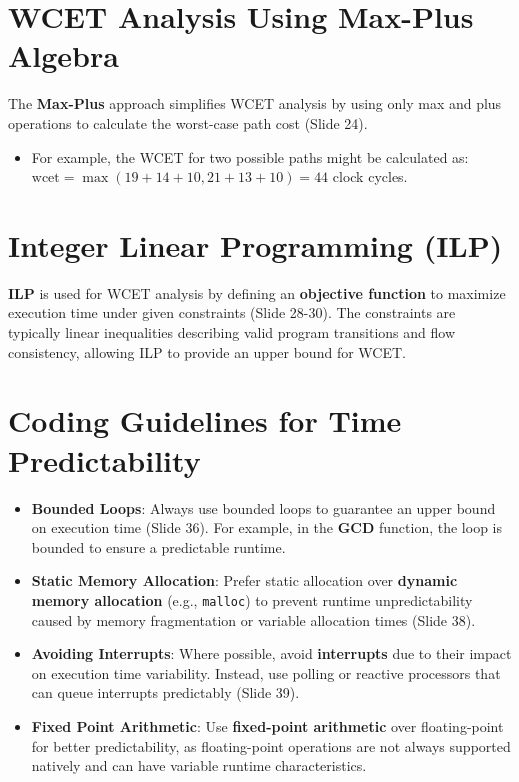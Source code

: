 \documentclass[
  14pt,
  a4paper,
  numbers=noendperiod,
  headinclude=true,
  footinclude=true,
  DIV=calc]{scrreprt}
\providecommand{\tightlist}{%
  \setlength{\itemsep}{0pt}\setlength{\parskip}{0pt}}\usepackage{longtable,booktabs,array}
\begin{document}
\section{WCET Analysis Using Max-Plus
Algebra}\label{wcet-analysis-using-max-plus-algebra}

The \textbf{Max-Plus} approach simplifies WCET analysis by using only
max and plus operations to calculate the worst-case path cost (Slide
24).

\begin{itemize}
\tightlist
\item
  For example, the WCET for two possible paths might be calculated as:
  \(\text{wcet} = \max(19 + 14 + 10, 21 + 13 + 10) = 44\) clock cycles.
\end{itemize}

\section{Integer Linear Programming
(ILP)}\label{integer-linear-programming-ilp}

\textbf{ILP} is used for WCET analysis by defining an \textbf{objective
function} to maximize execution time under given constraints (Slide
28-30). The constraints are typically linear inequalities describing
valid program transitions and flow consistency, allowing ILP to provide
an upper bound for WCET.

\section{Coding Guidelines for Time
Predictability}\label{coding-guidelines-for-time-predictability}

\begin{itemize}
\item
  \textbf{Bounded Loops}: Always use bounded loops to guarantee an upper
  bound on execution time (Slide 36). For example, in the \textbf{GCD}
  function, the loop is bounded to ensure a predictable runtime.
\item
  \textbf{Static Memory Allocation}: Prefer static allocation over
  \textbf{dynamic memory allocation} (e.g., \texttt{malloc}) to prevent
  runtime unpredictability caused by memory fragmentation or variable
  allocation times (Slide 38).
\item
  \textbf{Avoiding Interrupts}: Where possible, avoid
  \textbf{interrupts} due to their impact on execution time variability.
  Instead, use polling or reactive processors that can queue interrupts
  predictably (Slide 39).
\item
  \textbf{Fixed Point Arithmetic}: Use \textbf{fixed-point arithmetic}
  over floating-point for better predictability, as floating-point
  operations are not always supported natively and can have variable
  runtime characteristics.
\end{itemize}
\end{document}
